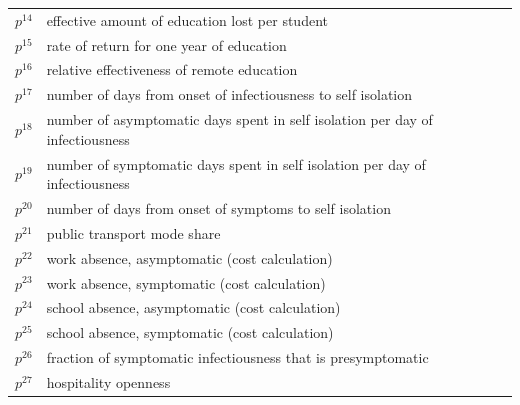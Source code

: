 \documentclass[
]{article}
\begin{document}
\begin{longtable}[]{@{}
  >{\centering\arraybackslash}p{}
  >{\centering\arraybackslash}p{}@{}}
\(p^{14}\) & effective amount of education
lost per student \\
\(p^{15}\) & rate of return for one year of
education \\
\(p^{16}\) & relative effectiveness of
remote education \\
\(p^{17}\) & number of days from onset of
infectiousness to self
isolation \\
\(p^{18}\) & number of asymptomatic days
spent in self isolation per
day of infectiousness \\
\(p^{19}\) & number of symptomatic days
spent in self isolation per
day of infectiousness \\
\(p^{20}\) & number of days from onset of
symptoms to self isolation \\
\(p^{21}\) & public transport mode share \\
\(p^{22}\) & work absence, asymptomatic
(cost calculation) \\
\(p^{23}\) & work absence, symptomatic
(cost calculation) \\
\(p^{24}\) & school absence, asymptomatic
(cost calculation) \\
\(p^{25}\) & school absence, symptomatic
(cost calculation) \\
\(p^{26}\) & fraction of symptomatic
infectiousness that is
presymptomatic \\
\(p^{27}\) & hospitality openness \\
\end{longtable}

\newpage

  
\end{document}
